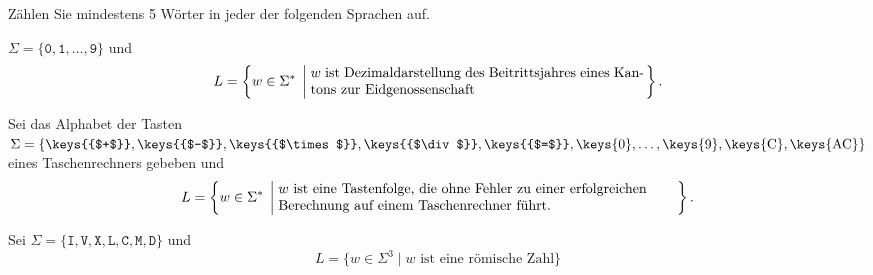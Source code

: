 Zählen Sie mindestens 5 Wörter in jeder der folgenden Sprachen auf.
\begin{teilaufgaben}
\item $\Sigma= \{\texttt{0},\texttt{1},\dots,\texttt{9}\}$ und
\[
L=\left\{ w\in\Sigma^*\;\left|\;
\begin{minipage}{8.4cm}
$w$ ist Dezimaldarstellung des Beitrittsjahres eines Kantons zur
Eidgenossenschaft
\end{minipage}
\right.\right\}.
\]
\item Sei das Alphabet der Tasten 
$\Sigma = \{
\text{\keys{{$+$}}},
\text{\keys{{$-$}}},
\text{\keys{{$\times$}}},
\text{\keys{{$\div$}}},
\text{\keys{{$=$}}},
\text{\keys{0}},
\dots,
\text{\keys{9}},
\text{\keys{C}},
\text{\keys{AC}}
\}
$
eines Taschenrechners gebeben und
\[
L=\left\{
w\in\Sigma^*\;
\left|
\;
\begin{minipage}{10cm}\raggedright
$w$ ist eine Tastenfolge, die ohne Fehler zu einer erfolgreichen Berechnung
auf einem Taschenrechner führt.
\end{minipage}
\right.
\right\}.
\]
\item
Sei $\Sigma = \{
\texttt{I},
\texttt{V},
\texttt{X},
\texttt{L},
\texttt{C},
\texttt{M},
\texttt{D}\}$ und
\[
L=\{
w\in\Sigma^3\;
|
\;
\text{$w$ ist eine römische Zahl}
\}
\]
\end{teilaufgaben}

